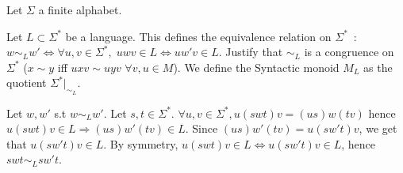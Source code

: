 \documentclass[a4paper,11pt]{exam}
\begin{document}
	Let $\Sigma$ a finite alphabet.
\begin{questions}
	

  Let $L \subset \Sigma^*$ be a language. This defines the equivalence relation on $\Sigma^*$~:
 $
    w \sim_L w' \Leftrightarrow \forall u, v\in \Sigma^*, \; uwv\in L
    \Leftrightarrow uw'v\in L
  $.
  Justify that $\sim_L $ is a congruence on $\Sigma^*$
  ($x\sim y$ iff $uxv\sim uyv \,\,\forall v,u\in M$).
  We define the Syntactic monoid $M_L$ as the quotient 
  $\Sigma^*|_{\sim_L}$.

  \begin{solution}
    Let $w,w'$ s.t $w \sim_L w'$.
    Let $s,t \in \Sigma^*$.
    $\forall u,v \in \Sigma^*, u(swt)v=(us)w(tv)$ hence
  ${u(swt)v \in L} \Rightarrow (us)w'(tv) \in L$.
    Since $(us)w'(tv)=u(sw't)v$, we get that $u(sw't)v \in L$.
    By symmetry, $u(swt)v \in L \iff u(sw't)v \in L$, hence $swt \sim_L sw't$.
  \end{solution}


\end{questions}
\end{document}
